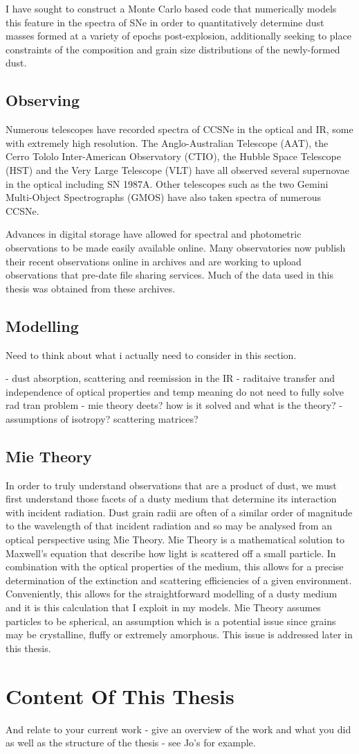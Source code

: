 I have sought to construct a Monte Carlo based code that numerically models this feature in the spectra of SNe in order to quantitatively determine dust masses formed at a variety of epochs post-explosion, additionally seeking to place constraints of the composition and grain size distributions of the newly-formed dust.

\subsection{Observing}

Numerous telescopes have recorded spectra of CCSNe in the optical and IR, some with extremely high resolution.  The Anglo-Australian Telescope (AAT), the Cerro Tololo Inter-American Observatory (CTIO), the Hubble Space Telescope (HST) and the Very Large Telescope (VLT) have all observed several supernovae in the optical including SN 1987A.  Other telescopes such as  the two Gemini Multi-Object Spectrographs (GMOS) have also taken spectra of numerous CCSNe.

Advances in digital storage have allowed for spectral and photometric observations to be made easily available online.  Many observatories now publish their recent observations online in archives and are working to upload observations that pre-date file sharing services.  Much of the data used in this thesis was obtained from these archives. 

\subsection{Modelling}
Need to think about what i actually need to consider in this section.

- dust absorption, scattering and reemission in the IR
- raditaive transfer and independence of optical properties and temp meaning do not need to fully solve rad tran problem
- mie theory deets?  how is it solved and what is the theory?
- assumptions of isotropy?  scattering matrices?
\subsection{Mie Theory}
\label{scn:mie_theory}
In order to truly understand observations that are a product of dust, we must first understand those facets of a dusty medium that determine its interaction with incident radiation.  Dust grain radii are often of a similar order of magnitude to the wavelength of that incident radiation and so may be analysed from an optical perspective using Mie Theory.  Mie Theory is a mathematical solution to Maxwell's equation that describe how light is scattered off a small particle.  In combination with the optical properties of the medium, this allows for a precise determination of the extinction and scattering efficiencies of a given environment.  Conveniently, this allows for the straightforward modelling of a dusty medium and it is this calculation that I exploit in my models.  Mie Theory assumes particles to be spherical, an assumption which is a potential issue since grains may be crystalline, fluffy or extremely amorphous.  This issue is addressed later in this thesis.



\section{Content Of This Thesis}
And relate to your current work - give an overview of the work and what you did as well as the structure of the thesis - see Jo's for example.
